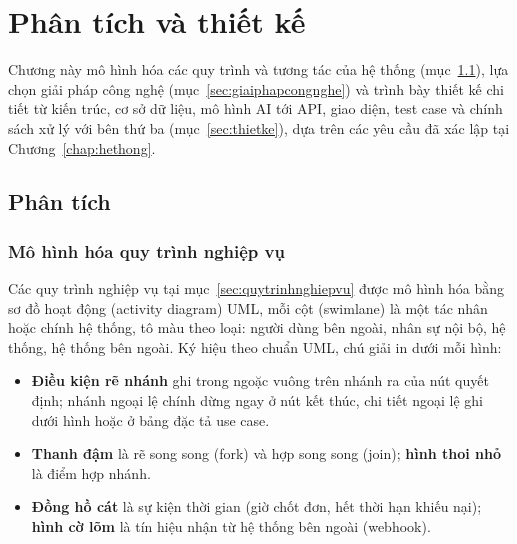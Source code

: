\chapter{Phân tích và thiết kế}
\label{chap:phantich}

Chương này mô hình hóa các quy trình và tương tác của hệ thống (mục~\ref{sec:phantich}), lựa chọn giải pháp công nghệ (mục~\ref{sec:giaiphapcongnghe}) và trình bày thiết kế chi tiết từ kiến trúc, cơ sở dữ liệu, mô hình AI tới API, giao diện, test case và chính sách xử lý với bên thứ ba (mục~\ref{sec:thietke}), dựa trên các yêu cầu đã xác lập tại Chương~\ref{chap:hethong}.

\section{Phân tích}
\label{sec:phantich}

\subsection{Mô hình hóa quy trình nghiệp vụ}
\label{subsec:mohinhquytrinh}

Các quy trình nghiệp vụ tại mục~\ref{sec:quytrinhnghiepvu} được mô hình hóa bằng sơ đồ hoạt động (activity diagram) UML, mỗi cột (swimlane) là một tác nhân hoặc chính hệ thống, tô màu theo loại: người dùng bên ngoài, nhân sự nội bộ, hệ thống, hệ thống bên ngoài. Ký hiệu theo chuẩn UML, chú giải in dưới mỗi hình:
\begin{itemize}
    \item \textbf{Điều kiện rẽ nhánh} ghi trong ngoặc vuông trên nhánh ra của nút quyết định; nhánh ngoại lệ chính dừng ngay ở nút kết thúc, chi tiết ngoại lệ ghi dưới hình hoặc ở bảng đặc tả use case.
    \item \textbf{Thanh đậm} là rẽ song song (fork) và hợp song song (join); \textbf{hình thoi nhỏ} là điểm hợp nhánh.
    \item \textbf{Đồng hồ cát} là sự kiện thời gian (giờ chốt đơn, hết thời hạn khiếu nại); \textbf{hình cờ lõm} là tín hiệu nhận từ hệ thống bên ngoài (webhook).
\end{itemize}

